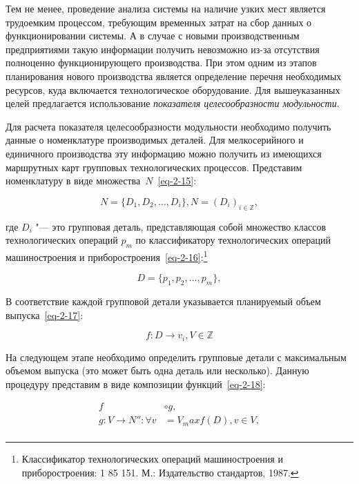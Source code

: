 Тем не менее, проведение анализа системы на наличие узких мест является трудоемким процессом, требующим временных затрат на сбор данных о функционировании системы. А в случае с новыми производственным предприятиями такую информации получить невозможно из-за отсутствия полноценно функционирующего производства. При этом одним из этапов планирования нового производства является определение перечня необходимых ресурсов, куда включается технологическое оборудование. Для вышеуказанных целей предлагается использование \textit{показателя целесообразности модульности}. 

Для расчета показателя целесообразности модульности необходимо получить данные о номенклатуре производимых деталей. Для мелкосерийного и единичного производства эту информацию можно получить из имеющихся маршрутных карт групповых технологических процессов. Представим номенклатуру в виде множества~$N$~\cref{eq-2-15}:

\begin{equation}
N = \{D_1, D_2, \ldots, D_i\}, N = (D_i)_{i \in \mathbb{Z}},
\label{eq-2-15}
\end{equation}


где $D_i$ "--- это групповая деталь, представляющая собой множество классов технологических операций $p_m$ по классификатору технологических операций машиностроения и приборостроения~\cref{eq-2-16}:\footnote{Классификатор технологических операций машиностроения и приборостроения: 1 85 151. М.: Издательство стандартов, 1987.}

\begin{equation}
D = \{p_1, p_2, \ldots, p_m\},
\label{eq-2-16}
\end{equation}

\noindent В соответствие каждой групповой детали указывается планируемый объем выпуска~\cref{eq-2-17}:

\begin{equation}
f: D \rightarrow v_i, V \in \mathbb{Z}
\label{eq-2-17}
\end{equation}

На следующем этапе необходимо определить групповые детали с максимальным объемом выпуска (это может быть одна деталь или несколько). Данную процедуру представим в виде композиции функций~\cref{eq-2-18}:

\begin{equation}
\begin{split}
f &\circ g, \\
g: V \rightarrow N'': \forall v &= V_max f(D), v \in V, \\
\end{split}
\label{eq-2-18}
\end{equation}

